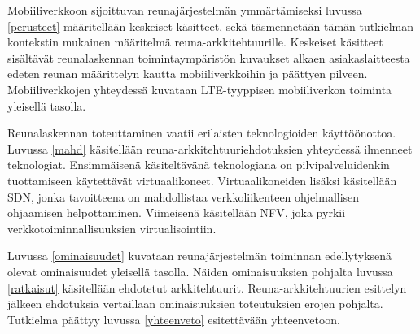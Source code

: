 Mobiiliverkkoon sijoittuvan reunajärjestelmän ymmärtämiseksi luvussa \ref{perusteet} määritellään keskeiset käsitteet, sekä täsmennetään tämän tutkielman kontekstin mukainen määritelmä reuna-arkkitehtuurille.
Keskeiset käsitteet sisältävät reunalaskennan toimintaympäristön kuvaukset alkaen asiakaslaitteesta edeten reunan määrittelyn kautta mobiiliverkkoihin ja päättyen pilveen.
Mobiiliverkkojen yhteydessä kuvataan LTE-tyyppisen mobiiliverkon toiminta yleisellä tasolla.

Reunalaskennan toteuttaminen vaatii erilaisten teknologioiden käyttöönottoa. Luvussa \ref{mahd} käsitellään reuna-arkkitehtuuriehdotuksien yhteydessä ilmenneet teknologiat. Ensimmäisenä käsiteltävänä teknologiana on pilvipalveluidenkin tuottamiseen käytettävät virtuaalikoneet.
Virtuaalikoneiden lisäksi käsitellään SDN, jonka tavoitteena on mahdollistaa verkkoliikenteen ohjelmallisen ohjaamisen helpottaminen. 
Viimeisenä käsitellään NFV, joka pyrkii verkkotoiminnallisuuksien virtualisointiin.

 Luvussa \ref{ominaisuudet} kuvataan reunajärjestelmän toiminnan edellytyksenä olevat ominaisuudet yleisellä tasolla. 
Näiden ominaisuuksien pohjalta luvussa \ref{ratkaisut} käsitellään ehdotetut arkkitehtuurit. 
Reuna-arkkitehtuurien esittelyn jälkeen ehdotuksia vertaillaan ominaisuuksien toteutuksien erojen pohjalta.
Tutkielma päättyy luvussa \ref{yhteenveto} esitettävään yhteenvetoon.


